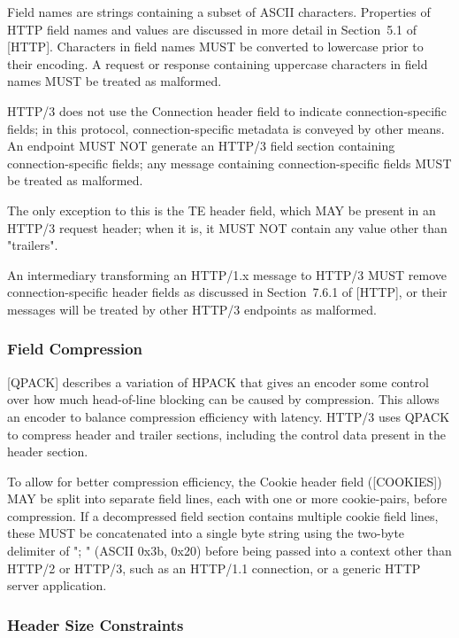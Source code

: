 \documentclass{article}
\begin{document}
Field names are strings containing a subset of ASCII characters. Properties of HTTP field names and values are discussed in more detail in Section~5.1 of [HTTP].  Characters in field names MUST be converted to lowercase prior to their encoding.  A request or response containing uppercase characters in field names MUST be treated as malformed.

HTTP/3 does not use the Connection header field to indicate connection-specific fields; in this protocol, connection-specific metadata is conveyed by other means.  An endpoint MUST NOT generate an HTTP/3 field section containing connection-specific fields; any message containing connection-specific fields MUST be treated as malformed.

The only exception to this is the TE header field, which MAY be present in an HTTP/3 request header; when it is, it MUST NOT contain any value other than "trailers".

An intermediary transforming an HTTP/1.x message to HTTP/3 MUST remove connection-specific header fields as discussed in Section~7.6.1 of [HTTP], or their messages will be treated by other HTTP/3 endpoints as malformed.

\subsubsection{Field Compression}

[QPACK] describes a variation of HPACK that gives an encoder some control over how much head-of-line blocking can be caused by compression.  This allows an encoder to balance compression efficiency with latency.  HTTP/3 uses QPACK to compress header and trailer sections, including the control data present in the header section.

To allow for better compression efficiency, the Cookie header field ([COOKIES]) MAY be split into separate field lines, each with one or more cookie-pairs, before compression.  If a decompressed field section contains multiple cookie field lines, these MUST be concatenated into a single byte string using the two-byte delimiter of "; " (ASCII 0x3b, 0x20) before being passed into a context other than HTTP/2 or HTTP/3, such as an HTTP/1.1 connection, or a generic HTTP server application.

\subsubsection{Header Size Constraints}
\end{document}

